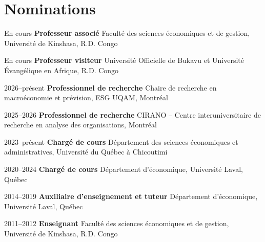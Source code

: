 \documentclass[11pt,letterpaper]{article}
\newenvironment{datelist}
  {\begin{description}[style=multiline,leftmargin=2.75cm,labelwidth=2.55cm,
     labelsep=0.2cm,font=\normalfont\small\color{soft},
     itemsep=0.45em,topsep=0.25em,parsep=0.15em]}
  {\end{description}}
\newcommand{\dotsep}{\;\textcolor{soft}{\textbullet}\;}
\begin{document}
\section{Nominations}
\begin{datelist}
  \item[En cours] \textbf{Professeur associé} \dotsep Faculté des sciences économiques et de gestion, Université de Kinshasa, R.D. Congo
  \item[En cours] \textbf{Professeur visiteur} \dotsep Université Officielle de Bukavu et Université Évangélique en Afrique, R.D. Congo
  \item[2026--présent] \textbf{Professionnel de recherche} \dotsep Chaire de recherche en macroéconomie et prévision, ESG UQAM, Montréal
  \item[2025--2026] \textbf{Professionnel de recherche} \dotsep CIRANO -- Centre interuniversitaire de recherche en analyse des organisations, Montréal
  \item[2023--présent] \textbf{Chargé de cours} \dotsep Département des sciences économiques et administratives, Université du Québec à Chicoutimi
  \item[2020--2024] \textbf{Chargé de cours} \dotsep Département d'économique, Université Laval, Québec
  \item[2014--2019] \textbf{Auxiliaire d'enseignement et tuteur} \dotsep Département d'économique, Université Laval, Québec
  \item[2011--2012] \textbf{Enseignant} \dotsep Faculté des sciences économiques et de gestion, Université de Kinshasa, R.D. Congo
\end{datelist}
\end{document}
